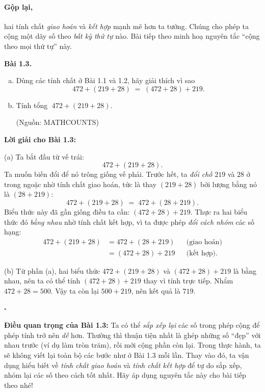 \documentclass[12pt,a4paper]{book}
\newenvironment{problem}[1][]{
  \par\noindent\textbf{Bài #1.}\ \ignorespaces
}{\par}
\begin{document}

\paragraph{Gộp lại,} hai tính chất \emph{giao hoán} và \emph{kết hợp}
mạnh mẽ hơn ta tưởng. Chúng cho phép ta cộng một dãy số theo \emph{bất
kỳ thứ tự} nào. Bài tiếp theo minh hoạ nguyên tắc “cộng theo mọi thứ
tự” này.

\begin{problem}[1.3]
\begin{enumerate}[(a)]
  \item Dùng các tính chất ở Bài 1.1 và 1.2, hãy giải thích vì sao
  \[
    472 + (219 + 28) \;=\; (472 + 28) + 219.
  \]
  \item Tính tổng \(\;472 + (219 + 28)\).
  \begin{flushright}\small(Nguồn: MATHCOUNTS)\end{flushright}
\end{enumerate}
\end{problem}

\noindent\textbf{Lời giải cho Bài 1.3:}

\smallskip
\noindent(a)\; Ta bắt đầu từ vế trái:
\[
  472 + (219 + 28).
\]
Ta muốn biến đổi để nó trông giống vế phải. Trước hết, ta \emph{đổi
chỗ} \(219\) và \(28\) ở trong ngoặc nhờ tính chất giao hoán, tức là
thay \((219+28)\) bởi lượng bằng nó là \((28+219)\):
\[
  472 + (219 + 28) \;=\; 472 + (28 + 219).
\]
Biểu thức này đã gần giống điều ta cần: \((472 + 28) + 219\).
Thực ra hai biểu thức đó \emph{bằng nhau} nhờ tính chất kết hợp, vì ta
được phép \emph{đổi cách nhóm} các số hạng:
\[
\begin{aligned}
  472 + (219 + 28) 
  &= 472 + (28 + 219) && \text{(giao hoán)}\\
  &= (472 + 28) + 219 && \text{(kết hợp).}
\end{aligned}
\]

\smallskip
\noindent(b)\; Từ phần (a), hai biểu thức
\(472 + (219 + 28)\) và \((472 + 28) + 219\) là bằng nhau, nên ta có
thể tính \((472 + 28) + 219\) thay vì tính trực tiếp.
Nhẩm \(472 + 28 = 500\). Vậy ta còn lại \(500 + 219\),
nên kết quả là \(719\).

\medskip
\noindent\(\square\)

\medskip
\noindent\textbf{Điều quan trọng của Bài 1.3:} Ta có thể \emph{sắp xếp
lại} các số trong phép cộng để phép tính trở nên \emph{dễ} hơn. Thường
thì thuận tiện nhất là ghép những số “đẹp” với nhau trước (ví dụ làm
tròn trăm), rồi mới cộng phần còn lại. Trong thực hành, ta sẽ không
viết lại toàn bộ các bước như ở Bài 1.3 mỗi lần. Thay vào đó, ta vận
dụng hiểu biết về \emph{tính chất giao hoán} và \emph{tính chất kết
hợp} để tự do sắp xếp, nhóm lại các số theo cách tốt nhất. Hãy áp dụng
nguyên tắc này cho bài tiếp theo nhé!
\end{document}
